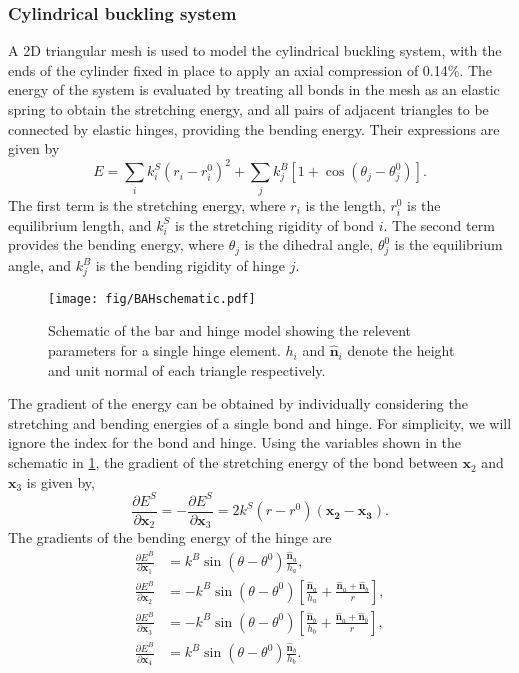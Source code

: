 \documentclass[twocolumn,10pt]{revtex4}
\begin{document}
\subsubsection{Cylindrical buckling system}
A 2D triangular mesh is used to model the cylindrical buckling system, with the ends of the cylinder fixed in place to apply an axial compression of 0.14\%.
The energy of the system is evaluated by treating all bonds in the mesh as an elastic spring to obtain the stretching energy, and all pairs of adjacent triangles to be connected by elastic hinges, providing the bending energy.
Their expressions are given by
\begin{equation}
  E = \sum_i k^S_i (r_i - r^0_i)^2 + \sum_j k^B_j [1 + \cos(\theta_j - \theta^0_j)].
\end{equation}
The first term is the stretching energy, where $r_i$ is the length, $r^0_i$ is the equilibrium length, and $k^S_i$ is the stretching rigidity of bond $i$.
The second term provides the bending energy, where $\theta_j$ is the dihedral angle, $\theta^0_j$ is the equilibrium angle, and $k^B_j$ is the bending rigidity of hinge $j$.

\begin{figure}[htb]
  \texttt{[image: fig/BAHschematic.pdf]}
  \caption{\label{fig:BAHschematic}
    Schematic of the bar and hinge model showing the relevent parameters for a single hinge element. $h_i$ and $\bm{\hat{n}}_i$ denote the height and unit normal of each triangle respectively.
  }
\end{figure}
The gradient of the energy can be obtained by individually considering the stretching and bending energies of a single bond and hinge.
For simplicity, we will ignore the index for the bond and hinge.
Using the variables shown in the schematic in \cref{fig:BAHschematic}, the gradient of the stretching energy of the bond between $\bm{x}_2$ and $\bm{x}_3$ is given by,
\begin{equation}
  \frac{\partial E^S}{\partial \bm{x}_2} = - \frac{\partial E^S}{\partial \bm{x}_3} =
    2 k^S (r - r^0) (\bm{x_2} - \bm{x_3}).
\end{equation}
The gradients of the bending energy of the hinge are
\begin{align}
  \frac{\partial E^B}{\partial \bm{x}_1} &= k^B \sin(\theta - \theta^0) \frac{\bm{\hat{n}}_a}{h_a}, \\
  \frac{\partial E^B}{\partial \bm{x}_2} &= - k^B \sin(\theta - \theta^0) \left[\frac{\bm{\hat{n}}_a}{h_a} + \frac{\bm{\hat{n}}_a + \bm{\hat{n}}_b}{r}\right], \\
  \frac{\partial E^B}{\partial \bm{x}_3} &= - k^B \sin(\theta - \theta^0) \left[\frac{\bm{\hat{n}}_b}{h_b} + \frac{\bm{\hat{n}}_a + \bm{\hat{n}}_b}{r}\right], \\
  \frac{\partial E^B}{\partial \bm{x}_4} &= k^B \sin(\theta - \theta^0) \frac{\bm{\hat{n}}_b}{h_b}.
\end{align}
\end{document}
